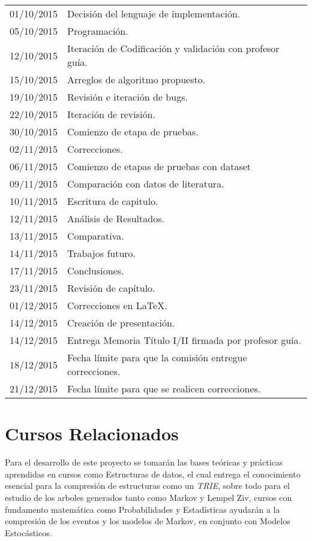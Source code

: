\documentclass{udparticle}
\begin{document}
\begin{center}
\begin{tabular}{ll}
  01/10/2015 & Decisión del lenguaje de implementación.\\
  05/10/2015 & Programación. \\
  12/10/2015 & Iteración de Codificación y validación con profesor guía.\\
  15/10/2015 & Arreglos de algoritmo propuesto.\\
  19/10/2015 & Revisión e iteración de bugs. \\
  22/10/2015 & Iteración de revisión. \\
  30/10/2015 & Comienzo de etapa de pruebas.\\
  
  02/11/2015 & Correcciones. \\
  06/11/2015 & Comienzo de etapas de pruebas con dataset\\
  09/11/2015 & Comparación con datos de literatura.\\
  10/11/2015 & Escritura de capitulo.\\
  12/11/2015 & Análisis de Resultados.\\
  13/11/2015 & Comparativa.\\
  14/11/2015 & Trabajos futuro.\\
  17/11/2015 & Conclusiones.\\
  23/11/2015 & Revisión de capítulo.\\

  01/12/2015 & Correcciones en \LaTeX. \\
  14/12/2015 & Creación de presentación.\\
  14/12/2015 & Entrega Memoria Título I/II firmada por profesor guía.\\
  18/12/2015 & Fecha límite para que la comisión entregue correcciones.\\
  21/12/2015 & Fecha límite para que se realicen correcciones.\\

  
  \hline
  \end{tabular}
  \end{center}

\newpage
\section{Cursos Relacionados}

Para el desarrollo de este proyecto se tomarán las bases teóricas y prácticas aprendidas en cursos como Estructuras de datos, 
el cual entrega el conocimiento esencial  para la compresión de estructuras como un \emph{TRIE}, sobre todo para el estudio de los arboles generados 
tanto como Markov y Lempel Ziv, cursos con fundamento matemática como Probabilidades y Estadísticas ayudarán a la compresión de los eventos
y los modelos de Markov, en conjunto con Modelos Estocásticos. 
\end{document}
